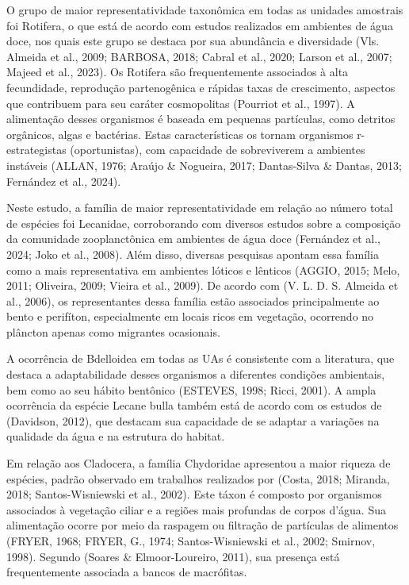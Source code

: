 \documentclass[
  letterpaper,
  DIV=11,
  numbers=noendperiod]{scrartcl}
\begin{document}
O grupo de maior representatividade taxonômica em todas as unidades
amostrais foi Rotifera, o que está de acordo com estudos realizados em
ambientes de água doce, nos quais este grupo se destaca por sua
abundância e diversidade (Vls. Almeida et al., 2009; BARBOSA, 2018;
Cabral et al., 2020; Larson et al., 2007; Majeed et al., 2023). Os
Rotifera são frequentemente associados à alta fecundidade, reprodução
partenogênica e rápidas taxas de crescimento, aspectos que contribuem
para seu caráter cosmopolitas (Pourriot et al., 1997). A alimentação
desses organismos é baseada em pequenas partículas, como detritos
orgânicos, algas e bactérias. Estas características os tornam organismos
r-estrategistas (oportunistas), com capacidade de sobreviverem a
ambientes instáveis (ALLAN, 1976; Araújo \& Nogueira, 2017; Dantas-Silva
\& Dantas, 2013; Fernández et al., 2024).

Neste estudo, a família de maior representatividade em relação ao número
total de espécies foi Lecanidae, corroborando com diversos estudos sobre
a composição da comunidade zooplanctônica em ambientes de água doce
(Fernández et al., 2024; Joko et al., 2008). Além disso, diversas
pesquisas apontam essa família como a mais representativa em ambientes
lóticos e lênticos (AGGIO, 2015; Melo, 2011; Oliveira, 2009; Vieira et
al., 2009). De acordo com (V. L. D. S. Almeida et al., 2006), os
representantes dessa família estão associados principalmente ao bento e
perifíton, especialmente em locais ricos em vegetação, ocorrendo no
plâncton apenas como migrantes ocasionais.

A ocorrência de Bdelloidea em todas as UAs é consistente com a
literatura, que destaca a adaptabilidade desses organismos a diferentes
condições ambientais, bem como ao seu hábito bentônico (ESTEVES, 1998;
Ricci, 2001). A ampla ocorrência da espécie Lecane bulla também está de
acordo com os estudos de (Davidson, 2012), que destacam sua capacidade
de se adaptar a variações na qualidade da água e na estrutura do
habitat.

Em relação aos Cladocera, a família Chydoridae apresentou a maior
riqueza de espécies, padrão observado em trabalhos realizados por
(Costa, 2018; Miranda, 2018; Santos-Wisniewski et al., 2002). Este táxon
é composto por organismos associados à vegetação ciliar e a regiões mais
profundas de corpos d'água. Sua alimentação ocorre por meio da raspagem
ou filtração de partículas de alimentos (FRYER, 1968; FRYER, G., 1974;
Santos-Wisniewski et al., 2002; Smirnov, 1998). Segundo (Soares \&
Elmoor-Loureiro, 2011), sua presença está frequentemente associada a
bancos de macrófitas.
\end{document}
